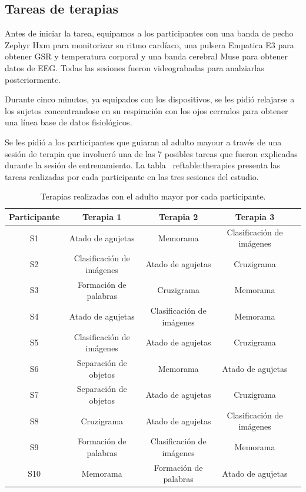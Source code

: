 \subsection{Tareas de terapias}
Antes de iniciar la tarea, equipamos a los participantes con una banda de pecho Zephyr Hxm para monitorizar su ritmo card\'iaco, una pulsera Empatica E3 para obtener GSR y temperatura corporal y una banda cerebral Muse para obtener datos de EEG. Todas las sesiones fueron videograbadas para analziarlas posteriormente.

Durante cinco minutos, ya equipados con los dispositivos, se les pidi\'o relajarse a los sujetos concentrandose en su respiraci\'on con los ojos cerrados para obtener una l\'inea base de datos fisiol\'ogicos.

Se les pidi\'o a los participantes que guiaran al adulto mayour a trav\'es de una sesi\'on de terapia que involucr\'o una de las 7 posibles tareas que fueron explicadas durante la sesi\'on de entrenamiento. La tabla ~ref{table:therapies} presenta las tareas realizadas por cada participante en las tres sesiones del estudio.
\begin{table}[h]
\centering
\caption{Terapias realizadas con el adulto mayor por cada participante.}
\label{table:therapies}
\begin{tabular}{|c|c|c|c|c|}
\hline
 \textbf{Participante}&  \textbf{Terapia 1}& \textbf{Terapia 2}   & \textbf{Terapia 3}  \\ \hline
 S1&  Atado de agujetas& Memorama & Clasificaci\'on de im\'agenes   \\ \hline
 S2&  Clasificaci\'on de im\'agenes& Atado de agujetas & Cruzigrama   \\ \hline
 S3&  Formaci\'on de palabras& Cruzigrama & Memorama    \\ \hline
 S4&  Atado de agujetas& Clasificaci\'on de im\'agenes & Memorama   \\ \hline
 S5&  Clasificaci\'on de im\'agenes&  Atado de agujetas & Cruzigrama   \\ \hline
 S6&  Separaci\'on de objetos& Memorama & Atado de agujetas   \\ \hline
 S7&  Separaci\'on de objetos & Atado de agujetas & Cruzigrama   \\ \hline
 S8&  Cruzigrama& Atado de agujetas & Clasificaci\'on de im\'agenes   \\ \hline
 S9&  Formaci\'on de palabras& Clasificaci\'on de im\'agenes & Memorama   \\ \hline
 S10&  Memorama& Formaci\'on de palabras & Atado de agujetas   \\ \hline
\end{tabular}
\end{table}
